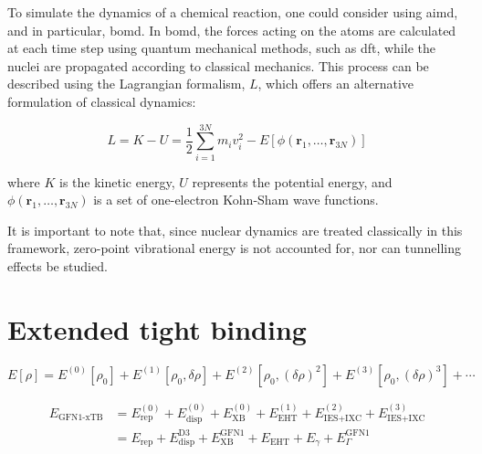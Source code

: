 To simulate the dynamics of a chemical reaction, one could consider using \ac{aimd}, and in particular, \ac{bomd}. In \ac{bomd}, the forces acting on the atoms are calculated at each time step using quantum mechanical methods, such as \ac{dft}, while the nuclei are propagated according to classical mechanics. This process can be described using the Lagrangian formalism, $L$, which offers an alternative formulation of classical dynamics:

\begin{equation}
    L = K - U = \frac{1}{2} \sum_{i=1}^{3N} m_i v_i^2 - E[\phi(\mathbf{r}_1, \ldots, \mathbf{r}_{3N})]
    \label{eq:lagrangian_aimd}
\end{equation}

where $K$ is the kinetic energy, $U$ represents the potential energy, and $\phi(\mathbf{r}_1, \ldots, \mathbf{r}_{3N})$ is a set of one-electron Kohn-Sham wave functions.

It is important to note that, since nuclear dynamics are treated classically in this framework, zero-point vibrational energy is not accounted for, nor can tunnelling effects be studied. 




\section{Extended tight binding}

\begin{equation}
    E[\rho] = E^{(0)}[\rho_0] + E^{(1)}[\rho_0, \delta \rho] + E^{(2)}[\rho_0, (\delta \rho)^2] + E^{(3)}[\rho_0, (\delta \rho)^3] + \cdots
    \label{eq:tb_energy_expansion}
\end{equation}

\begin{equation}
    \begin{aligned}
    E_{\text{GFN1-xTB}} &= E_{\text{rep}}^{(0)} + E_{\text{disp}}^{(0)} + E_{\text{XB}}^{(0)} + E_{\text{EHT}}^{(1)} + E_{\text{IES+IXC}}^{(2)} + E_{\text{IES+IXC}}^{(3)} \\
    &= E_{\text{rep}} + E_{\text{disp}}^{\text{D3}} + E_{\text{XB}}^{\text{GFN1}} + E_{\text{EHT}} + E_{\gamma} + E_{\Gamma}^{\text{GFN1}}
    \end{aligned}
    \label{eq:gfn1xtb_energy}
\end{equation}




